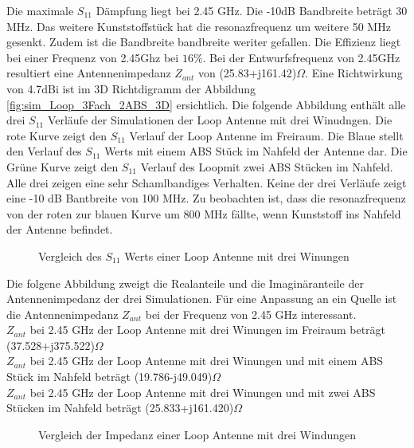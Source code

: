 Die maximale $S_{11}$ Dämpfung liegt bei 2.45 GHz. Die -10dB Bandbreite beträgt 30 MHz. Das weitere Kunststoffstück hat die resonazfrequenz um weitere 50 MHz gesenkt. Zudem ist die Bandbreite bandbreite weriter gefallen. Die Effizienz liegt bei einer Frequenz von 2.45Ghz bei $16\%$. Bei der Entwurfsfrequenz von 2.45GHz resultiert eine Antennenimpedanz $Z_{ant}$ von (25.83+j161.42)$\Omega$.
Eine Richtwirkung von 4.7dBi ist im 3D Richtdigramm der Abbildung \ref{fig:sim_Loop_3Fach_2ABS_3D} ersichtlich.
\newpage
Die folgende Abbildung enthält alle drei $S_{11}$ Verläufe der Simulationen der Loop Antenne mit drei Winudngen. Die rote Kurve zeigt den $S_{11}$ Verlauf der Loop Antenne im Freiraum. Die Blaue stellt den Verlauf des $S_{11}$ Werts mit einem ABS Stück im Nahfeld der Antenne dar. Die Grüne Kurve zeigt den $S_{11}$ Verlauf des Loopmit zwei ABS Stücken im Nahfeld. Alle drei zeigen eine sehr Schamlbandiges Verhalten. Keine der drei Verläufe zeigt eine -10 dB Bantbreite von 100 MHz. Zu beobachten ist, dass die resonazfrequenz von der roten zur blauen Kurve um 800 MHz fällte, wenn Kunststoff ins Nahfeld der Antenne befindet.
\begin{figure}[!ht]
	\centering
	\begingroup
	
	\endgroup
	\caption{Vergleich des $S_{11}$ Werts einer Loop Antenne mit drei Winungen}
	\label{S11_Loop_3N_Vergleich_Simulation}
\end{figure}
\newpage
Die folgene Abbildung zweigt die Realanteile und die Imaginäranteile der Antennenimpedanz der drei Simulationen. Für eine Anpassung an ein Quelle ist die Antennenimpedanz $Z_{ant}$ bei der Frequenz von 2.45 GHz interessant.\\
$Z_{ant}$ bei 2.45 GHz der Loop Antenne mit drei Winungen im Freiraum beträgt (37.528+j375.522)$\Omega$\\
$Z_{ant}$ bei 2.45 GHz der Loop Antenne mit drei Winungen und mit einem ABS Stück im Nahfeld beträgt (19.786-j49.049)$\Omega$\\
$Z_{ant}$ bei 2.45 GHz der Loop Antenne mit drei Winungen und mit zwei ABS Stücken im Nahfeld beträgt (25.833+j161.420)$\Omega$
\begin{figure}[!ht]
	\centering
	\begingroup
	
	\endgroup
	\caption{Vergleich der Impedanz einer Loop Antenne mit drei Windungen}
	\label{Impedanz_Loop_3N_Vergleich_Simulation}
\end{figure}

